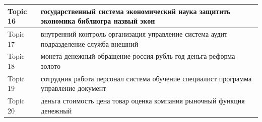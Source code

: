 \documentclass[a4paper, 14pt]{extarticle}
\begin{document}
\begin{landscape}
\begin{small}
\begin{singlespace}
\begin{table}[h]
\begin{tabular}{|l|l|}
			Topic 16 &  государственный система экономический наука защитить экономика библиогра назвый экон \\ \hline
			Topic 17 &  внутренний контроль организация управление система аудит подразделение служба внешний \\ \hline
			Topic 18 &  монета денежный обращение россия рубль год деньга реформа золото \\ \hline
			Topic 19 &  сотрудник работа персонал система обучение специалист программа управление документ \\ \hline
			Topic 20 &  деньга стоимость цена товар оценка компания рыночный функция денежный \\ \hline
		\end{tabular}
		\end{table}
	
		\end{singlespace}
	\end{small}
\end{landscape}
\end{document}

